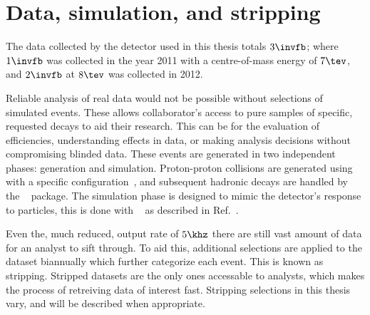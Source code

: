 \section{Data, simulation, and stripping}

The data collected by the \lhcb detector used in this thesis totals $3\invfb$; where $1\invfb$ was
collected in the year 2011 with a centre-of-mass energy of $7\tev$, and $2\invfb$ at $8\tev$ was
collected in 2012.

Reliable analysis of real data would not be possible without selections of simulated events.
These allows collaborator's access to pure samples of specific, requested decays to aid their
research.
This can be for the evaluation of efficiencies, understanding effects in data, or making analysis
decisions without compromising blinded data.
These events are generated in two independent phases: generation and simulation.
Proton-proton collisions are generated using \pythia~\cite{Sjostrand:2006za,*Sjostrand:2007gs}
with a specific \lhcb configuration~\cite{LHCb-PROC-2010-056},
and subsequent hadronic decays are handled by the \evtgen~\cite{Lange:2001uf} package.
The simulation phase is designed to mimic the \lhcb detector's response to particles, this is done
with \geant~\cite{Allison:2006ve,*Agostinelli:2002hh} as described in
Ref.~\cite{LHCb-PROC-2011-006}.

Even the, much reduced, output rate of $5\khz$ there are still vast amount of data for an
analyst to sift through.
To aid this, additional selections are applied to the dataset biannually which further categorize
each event.
This is known as stripping.
Stripped datasets are the only ones accessable to analysts, which makes the process of retreiving
data of interest fast.
Stripping selections in this thesis vary, and will be described when appropriate.













